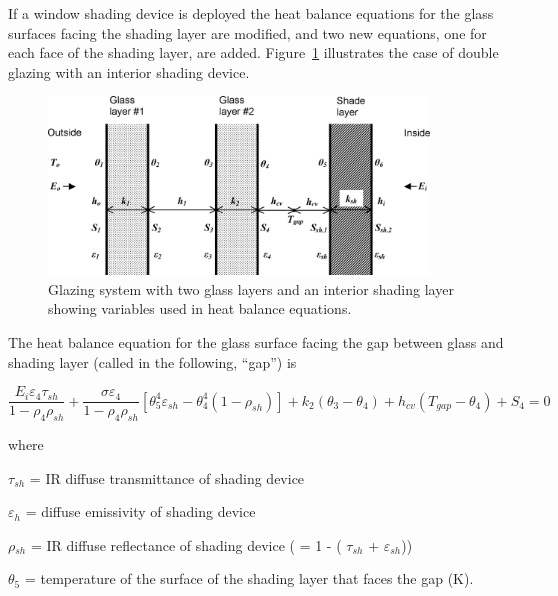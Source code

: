 If a window shading device is deployed the heat balance equations for the glass surfaces facing the shading layer are modified, and two new equations, one for each face of the shading layer, are added. Figure~\ref{fig:glazing-system-with-two-glass-layers-and-an} illustrates the case of double glazing with an interior shading device.

\begin{figure}[hbtp] %
\centering
\includegraphics[width=0.9\textwidth, height=0.9\textheight, keepaspectratio=true]{media/image1663.png}
\caption{Glazing system with two glass layers and an interior shading layer showing variables used in heat balance equations. \protect \label{fig:glazing-system-with-two-glass-layers-and-an}}
\end{figure}

The heat balance equation for the glass surface facing the gap between glass and shading layer (called in the following, ``gap'') is

\begin{equation}
\frac{{{E_i}{\varepsilon_4}{\tau_{sh}}}}{{1 - {\rho_4}{\rho_{sh}}}} + \frac{{\sigma {\varepsilon_4}}}{{1 - {\rho_4}{\rho_{sh}}}}\left[ {\theta_5^4{\varepsilon_{sh}} - \theta_4^4(1 - {\rho_{sh}})} \right] + {k_2}\left( {{\theta_3} - {\theta_4}} \right) + {h_{cv}}\left( {{T_{gap}} - {\theta_4}} \right) + {S_4} = 0
\end{equation}

where

\emph{$\tau$\(_{sh}\)} = IR diffuse transmittance of shading device

\emph{$\varepsilon$\(_{h}\)} = diffuse emissivity of shading device

\emph{$\rho$\(_{sh}\)} = IR diffuse reflectance of shading device ( = 1 - ( \emph{$\tau$\(_{sh}\)} + \emph{$\varepsilon$\(_{sh}\)}))

\emph{$\theta$\(_{5}\)} = temperature of the surface of the shading layer that faces the gap (K).

